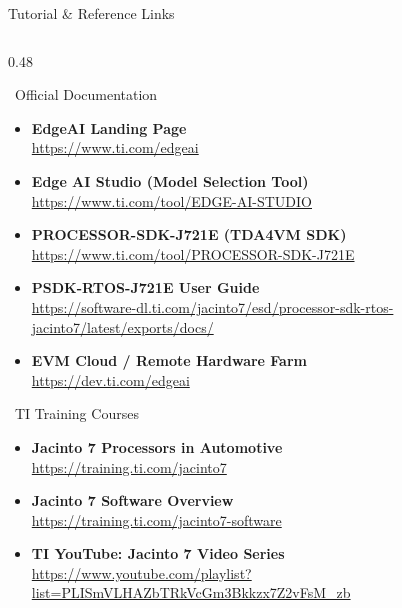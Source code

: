 \documentclass[aspectratio=169,12pt]{beamer}
\begin{document}
\begin{frame}{Tutorial \& Reference Links}
  \begin{columns}[T]
    \begin{column}{0.48\textwidth}

      \begin{block}{\faBook~Official Documentation}
        \begin{itemize}\scriptsize
          \item \textbf{EdgeAI Landing Page}\\
                \url{https://www.ti.com/edgeai}
          \item \textbf{Edge AI Studio (Model Selection Tool)}\\
                \url{https://www.ti.com/tool/EDGE-AI-STUDIO}
          \item \textbf{PROCESSOR-SDK-J721E (TDA4VM SDK)}\\
                \url{https://www.ti.com/tool/PROCESSOR-SDK-J721E}
          \item \textbf{PSDK-RTOS-J721E User Guide}\\
                {\tiny\url{https://software-dl.ti.com/jacinto7/esd/processor-sdk-rtos-jacinto7/latest/exports/docs/}}
          \item \textbf{EVM Cloud / Remote Hardware Farm}\\
                \url{https://dev.ti.com/edgeai}
        \end{itemize}
      \end{block}

      \vspace{0.2cm}
      \begin{block}{\faGraduationCap~TI Training Courses}
        \begin{itemize}\scriptsize
          \item \textbf{Jacinto 7 Processors in Automotive}\\
                \url{https://training.ti.com/jacinto7}
          \item \textbf{Jacinto 7 Software Overview}\\
                \url{https://training.ti.com/jacinto7-software}
          \item \textbf{TI YouTube: Jacinto 7 Video Series}\\
                {\tiny\url{https://www.youtube.com/playlist?list=PLISmVLHAZbTRkVcGm3Bkkzx7Z2vFsM_zb}}
        \end{itemize}
      \end{block}


\end{column}
\end{columns}
\end{frame}
\end{document}
